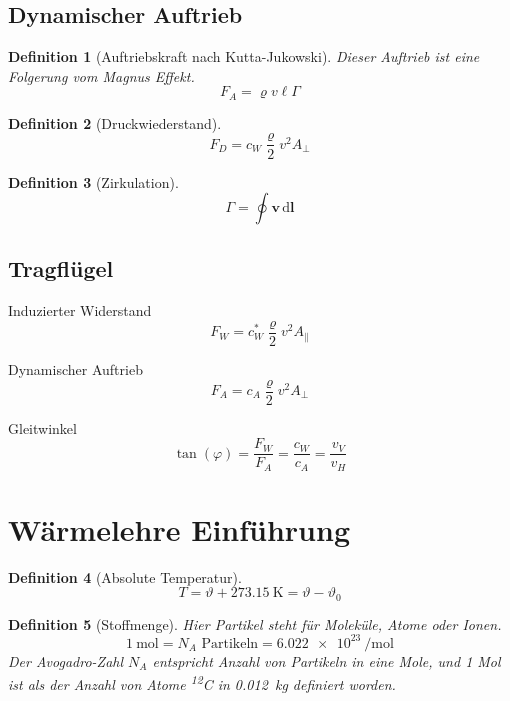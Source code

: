 \documentclass[a4paper, twocolumn]{article}
\numberwithin{equation}{section}
\theoremstyle{hsr-def}
\newtheorem{definition}{Definition}[section]
\theoremstyle{hsr-sub}
\newcommand{\dd}[1]{\ensuremath{\mathrm{d}#1}}
\newcommand{\di}[1]{\,\dd{#1}}
\renewcommand{\vec}[1]{\ensuremath{\mathbf{#1}}}
\begin{document}
\subsection{Dynamischer Auftrieb}
\begin{definition}[Auftriebskraft nach Kutta-Jukowski] Dieser Auftrieb ist eine Folgerung vom \emph{Magnus Effekt}.
\[
    F_A = \varrho v \ell \Gamma
\]
\end{definition}

\begin{definition}[Druckwiederstand]
\[
    F_D = c_W \frac{\varrho}{2}v^2 A_\perp
\]
\end{definition}

\begin{definition}[Zirkulation]
\[
    \Gamma = \oint \vec{v} \di{\vec{l}}
\]
\end{definition}

\subsection{Tragfl\"ugel}

Induzierter Widerstand
\[
    F_W = c_W^* \frac{\varrho}{2} v^2 A_\parallel
\]

Dynamischer Auftrieb
\[
    F_A = c_A \frac{\varrho}{2} v^2 A_\perp
\]

Gleitwinkel
\[
    \tan(\varphi) = \frac{F_W}{F_A} = \frac{c_W}{c_A} = \frac{v_V}{v_H}
\]

\section{W\"armelehre Einf\"uhrung}
\begin{definition}[Absolute Temperatur]
\[
    T = \vartheta + \SI{273.15}{\kelvin} = \vartheta - \vartheta_0
\]
\end{definition}

\begin{definition}[Stoffmenge]
Hier \emph{Partikel} steht f\"ur Molek\"ule, Atome oder Ionen.
\[
    \SI{1}{\mole} = N_A \text{ Partikeln} = \SI{6.022e23}{\per\mole}
\]
Der Avogadro-Zahl \(N_A\) entspricht Anzahl von Partikeln in eine Mole, und 1 Mol ist als der Anzahl von Atome \textsuperscript{12}C in \SI{0.012}{\kilo\gram} definiert worden.
\end{definition}
\end{document}
